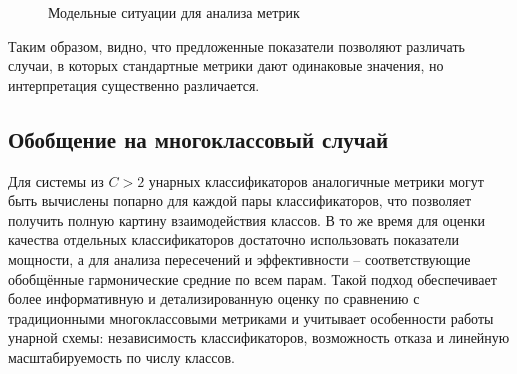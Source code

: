 \begin{figure}[ht]
    \caption{Модельные ситуации для анализа метрик}
    \label{fig:metrics_cases}
\end{figure}

Таким образом, видно, что предложенные показатели позволяют различать случаи, в которых стандартные метрики дают одинаковые значения, но интерпретация существенно различается.

\subsection{Обобщение на многоклассовый случай}

Для системы из \(C > 2\) унарных классификаторов аналогичные метрики могут быть вычислены попарно для каждой пары классификаторов, что позволяет получить полную картину взаимодействия классов. В то же время для оценки качества отдельных классификаторов достаточно использовать показатели мощности, а для анализа пересечений и эффективности -- соответствующие обобщённые гармонические средние по всем парам. Такой подход обеспечивает более информативную и детализированную оценку по сравнению с традиционными многоклассовыми метриками и учитывает особенности работы унарной схемы: независимость классификаторов, возможность отказа и линейную масштабируемость по числу классов.
